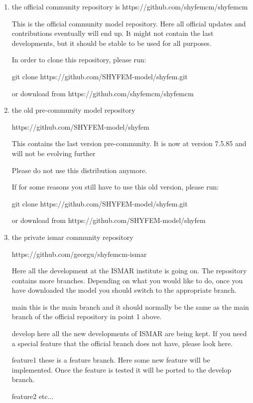 \begin{enumerate}

\item  the official community repository is https://github.com/shyfemcm/shyfemcm

	This is the official community model repository. Here all official updates and contributions eventually will end up. It might not 	contain the last developments, but it should be stable to be used for all purposes.

	In order to clone this repository, please run:

	git clone https://github.com/SHYFEM-model/shyfem.git

	or download from https://github.com/shyfemcm/shyfemcm

\item  the old pre-community model repository

	https://github.com/SHYFEM-model/shyfem

	This contains the last version pre-community. It is now at
	version 7.5.85 and will not be evolving further

	Please do not use this distribution anymore.

	If for some reasons you still have to use this old version,
	please run:

	git clone https://github.com/SHYFEM-model/shyfem.git

	or download from https://github.com/SHYFEM-model/shyfem

\item  the private ismar community repository

	https://github.com/georgu/shyfemcm-ismar

	Here all the development at the ISMAR institute is going on. The
	repository contains more branches. Depending on what you would
	like to do, once you have downloaded the model you should switch
	to the appropriate branch.

	main		this is the main branch and it should normally
			be the same as the main branch of the official
			repository in point 1 above.

	develop		here all the new developments of ISMAR are being
			kept. If you need a special feature that the
			official branch does not have, please look here.

	feature1	these is a feature branch. Here some new feature
			will be implemented. Once the feature is tested
			it will be ported to the develop branch.

	feature2	etc...


\end{enumerate}
